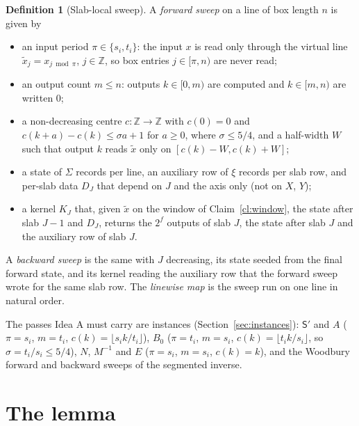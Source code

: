 \documentclass[11pt]{article}
\theoremstyle{definition}\newtheorem{definition}{Definition}
\theoremstyle{remark}\newtheorem*{remark}{Remark}
\begin{document}
\begin{definition}[Slab-local sweep]\label{def:sweep}
A \emph{forward sweep} on a line of box length $n$ is given by
\begin{itemize}
\item an input period $\pi\in\{s_i,t_i\}$: the input $x$ is read only through the virtual
line $\tilde x_j=x_{j\bmod\pi}$, $j\in\mathbb Z$, so box entries $j\in[\pi,n)$ are never read;
\item an output count $m\le n$: outputs $k\in[0,m)$ are computed and $k\in[m,n)$ are written $0$;
\item a non-decreasing centre $c:\mathbb Z\to\mathbb Z$ with $c(0)=0$ and
$c(k+a)-c(k)\le\sigma a+1$ for $a\ge0$, where $\sigma\le5/4$, and a half-width $W$ such that
output $k$ reads $\tilde x$ only on $[c(k)-W,c(k)+W]$;
\item a state of $\Sigma$ records per line, an auxiliary row of $\xi$ records per slab row,
and per-slab data $D_J$ that depend on $J$ and the axis only (not on $X$, $Y$);
\item a kernel $K_J$ that, given $\tilde x$ on the window of Claim~\ref{cl:window}, the state
after slab $J-1$ and $D_J$, returns the $2^f$ outputs of slab $J$, the state after slab $J$ and
the auxiliary row of slab $J$.
\end{itemize}
A \emph{backward sweep} is the same with $J$ decreasing, its state seeded from the final
forward state, and its kernel reading the auxiliary row that the forward sweep wrote for the
same slab row. The \emph{linewise map} is the sweep run on one line in natural order.
\end{definition}

The passes Idea A must carry are instances (Section~\ref{sec:instances}): $\mathsf S'$ and
$A$ ($\pi=s_i$, $m=t_i$, $c(k)=\lfloor s_ik/t_i\rfloor$), $B_0$ ($\pi=t_i$, $m=s_i$,
$c(k)=\lfloor t_ik/s_i\rfloor$, so $\sigma=t_i/s_i\le5/4$), $N$, $M^{-1}$ and $E$
($\pi=s_i$, $m=s_i$, $c(k)=k$), and the Woodbury forward and backward sweeps of the segmented
inverse.

\section{The lemma}
\end{document}
